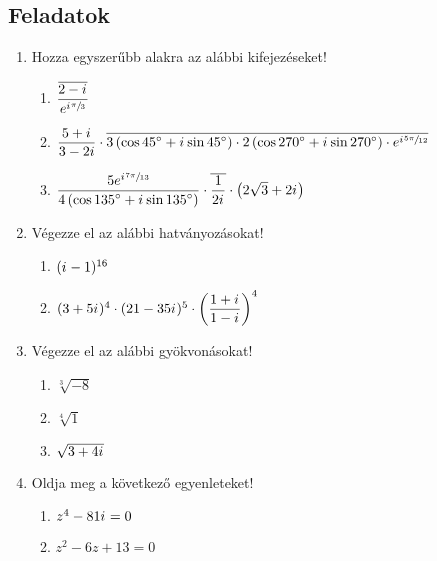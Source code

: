 \documentclass[a4paper, 12pt]{scrartcl}
\begin{document}
\clearpage
\subsection{Feladatok}

\begin{enumerate}
  \item Hozza egyszerűbb alakra az alábbi kifejezéseket!
        \begin{enumerate}
          \item $\dfrac{
                    \overline{2 - {i\mkern1mu}}
                  }{
                    e^{{i\mkern1mu} \sfrac{\pi}{3}}
                  }$
          \item $\dfrac{5 + \iu}{3 - 2i} \cdot \overline{
                    \rcisdeg*{3}{45} \cdot
                    \rcisdeg*{2}{270} \cdot
                    e^{\iu \sfrac{5\pi}{12}}
                  }$

          \item $\dfrac{
                    5 e^{\iu \sfrac{7\pi}{13}}
                  }{
                    \rcisdeg*{4}{135}
                  } \cdot \overline{
                    \dfrac{1}{2\iu}
                  } \cdot \left(
                  2 \sqrt{3} + 2 \iu
                  \right)
                $
        \end{enumerate}

  \item Végezze el az alábbi hatványozásokat!
        \begin{enumerate}
          \item $({i\mkern1mu} - 1)^{16}$
          \item $(3 + 5{i\mkern1mu})^4 \cdot
                  (21 - 35{i\mkern1mu})^5 \cdot
                  \left(\dfrac{1 + {i\mkern1mu}}{1 - {i\mkern1mu}}\right)^4$
        \end{enumerate}

  \item Végezze el az alábbi gyökvonásokat!
        \begin{enumerate}
          \item $\sqrt[3]{-8}$
          \item $\sqrt[4]{1}$
          \item $\sqrt{3 + 4{i\mkern1mu}}$
        \end{enumerate}

  \item Oldja meg a következő egyenleteket!
        \begin{enumerate}
          \item $z^4 - 81 {i\mkern1mu} = 0$
          \item $z^2 - 6z + 13 = 0$
        \end{enumerate}


\end{enumerate}
\end{document}
